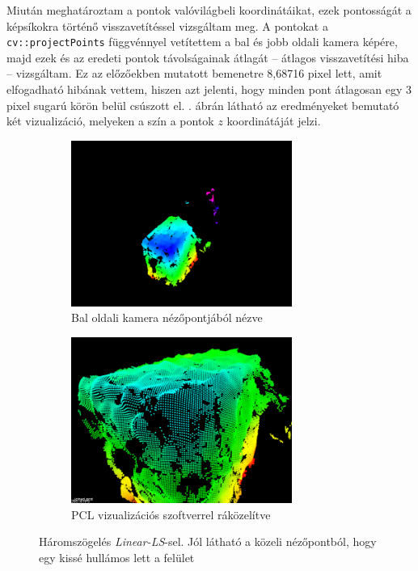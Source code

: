 Miután meghatároztam a pontok valóvilágbeli koordinátáikat, ezek pontosságát a képsíkokra történő visszavetítéssel vizsgáltam meg. A pontokat a \texttt{cv::projectPoints} függvénnyel vetítettem a bal és jobb oldali kamera képére, majd ezek és az eredeti pontok távolságainak átlagát -- átlagos visszavetítési hiba -- vizsgáltam. Ez az előzőekben mutatott bemenetre 8,68716 pixel lett, amit elfogadható hibának vettem, hiszen azt jelenti, hogy minden pont átlagosan egy 3 pixel sugarú körön belül csúszott el. . ábrán látható az eredményeket bemutató két vizualizáció, melyeken a szín a pontok $z$ koordinátáját jelzi. 

\begin{figure}[tbh]
\centering
\begin{subfigure}[b]{.49\linewidth}
	\centering
	\includegraphics[width=205pt]{figures/visu_left.png}
	\caption{Bal oldali kamera nézőpontjából nézve \label{fig:cv-triangulation-a}}
  \end{subfigure}
\begin{subfigure}[b]{.49\linewidth}
	\centering
	\includegraphics[width=205pt]{figures/visu_pcl.png}
	\caption{PCL vizualizációs szoftverrel ráközelítve}
  \end{subfigure}
\caption{Háromszögelés \textit{Linear-LS}-sel. Jól látható a közeli nézőpontból, hogy egy kissé hullámos lett a felület \label{fig:cv-triangulation}}
\end{figure}

